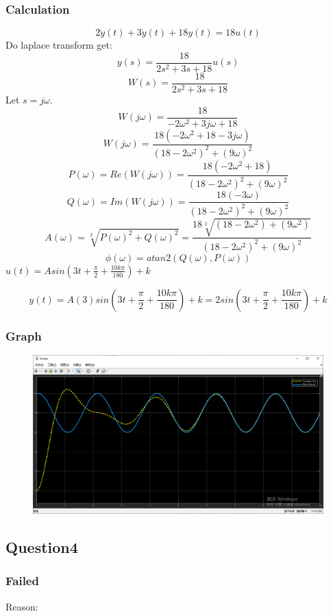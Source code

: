 \documentclass[12pt,a4paper,oneside]{ctexart}
\begin{document}
        \subsubsection{Calculation}
            $$2\ddot{y}(t) + 3\dot{y}(t) + 18y(t) = 18u(t)$$
            Do laplace transform get:
            $$y(s) = \frac{18}{2s^2+3s+18}u(s)$$
            $$W(s) = \frac{18}{2s^2+3s+18}$$
            Let $s = j\omega$.
            $$W(j\omega) = \frac{18}{-2\omega^2+3j\omega+18}$$
            $$W(j\omega) = \frac{18(-2\omega^2+18-3j\omega)}{(18-2\omega^2)^2+(9\omega)^2}$$
            $$P(\omega) = Re(W(j\omega)) = \frac{18(-2\omega^2+18)}{(18-2\omega^2)^2+(9\omega)^2}$$
            $$Q(\omega) = Im(W(j\omega)) = \frac{18(-3\omega)}{(18-2\omega^2)^2+(9\omega)^2}$$
            $$A(\omega) = \sqrt[2]{P(\omega)^2 + Q(\omega)^2} = \frac{18\sqrt[2]{(18-2\omega^2)+(9\omega^2)}}{(18-2\omega^2)^2+(9\omega)^2}$$
            $$\phi(\omega) = atan2(Q(\omega),P(\omega))$$
            $u(t) = Asin(3t+\frac{\pi}{2}+\frac{10k\pi}{180})+k$

            $$y(t) = A(3)sin(3t+\frac{\pi}{2}+\frac{10k\pi}{180}) + k = 2sin(3t+\frac{\pi}{2}+\frac{10k\pi}{180})+k$$
        \subsubsection{Graph}
            \begin{figure}[H]
                \includegraphics[width = 0.9\linewidth]{Q3}
            \end{figure}
    \subsection{Question4}
        \subsubsection{Failed}
        Reason:
\end{document}
